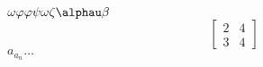  \(\omega\varphi\varphi\psi\omega\zeta\alphau\beta\)
\begin{equation}
 \begin{bmatrix}
    2 & 4 \\ 
    3 & 4
\end{bmatrix}
\end{equation}
 \(a_ a_n \dots \)
